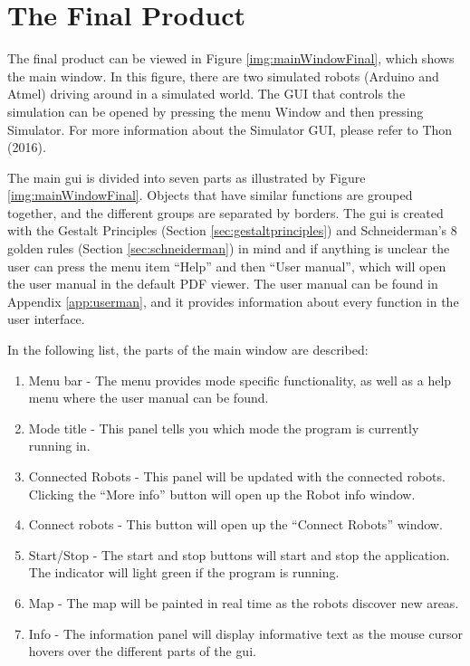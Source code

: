 \section{The Final Product}
\label{secr:finprodgui}
The final product can be viewed in Figure \ref{img:mainWindowFinal}, which shows the main window. In this figure, there are two simulated robots (Arduino and Atmel) driving around in a simulated world. The GUI that controls the simulation can be opened by pressing the menu Window and then pressing Simulator. For more information about the Simulator GUI, please refer to Thon (2016).


The main \acrshort{gui} is divided into seven parts as illustrated by Figure \ref{img:mainWindowFinal}. Objects that have similar functions are grouped together, and the different groups are separated by borders. The \acrshort{gui} is created with the Gestalt Principles (Section \ref{sec:gestaltprinciples}) and Schneiderman's 8 golden rules (Section \ref{sec:schneiderman}) in mind and if anything is unclear the user can press the menu item ``Help'' and then ``User manual'', which will open the user manual in the default PDF viewer. The user manual can be found in Appendix \ref{app:userman}, and it provides information about every function in the user interface.

In the following list, the parts of the main window are described:
\begin{enumerate}
	\item Menu bar - The menu provides mode specific functionality, as well as a help menu where the user manual can be found.
    \item Mode title - This panel tells you which mode the program is currently running in.
    \item Connected Robots - This panel will be updated with the connected robots. Clicking the ``More info'' button will open up the Robot info window.
    \item Connect robots - This button will open up the ``Connect Robots'' window.
    \item Start/Stop - The start and stop buttons will start and stop the application. The indicator will light green if the program is running.
    \item Map - The map will be painted in real time as the robots discover new areas.
    \item Info - The information panel will display informative text as the mouse cursor hovers over the different parts of the \acrshort{gui}.
\end{enumerate}

